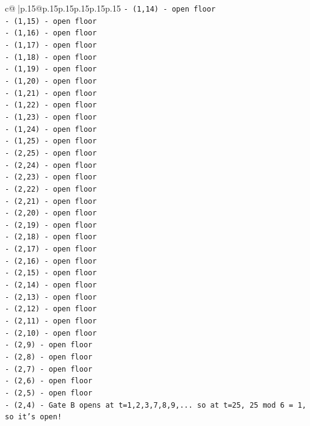 \documentclass{article}
\begin{document}
{\begin{supertabular}{c@{$\;$}|p{.15\linewidth}@{}p{.15\linewidth}p{.15\linewidth}p{.15\linewidth}p{.15\linewidth}p{.15\linewidth}}
{{{\texttt{{-} (1,14) {-} open floor} \\
\texttt{{-} (1,15) {-} open floor} \\
\texttt{{-} (1,16) {-} open floor} \\
\texttt{{-} (1,17) {-} open floor} \\
\texttt{{-} (1,18) {-} open floor} \\
\texttt{{-} (1,19) {-} open floor} \\
\texttt{{-} (1,20) {-} open floor} \\
\texttt{{-} (1,21) {-} open floor} \\
\texttt{{-} (1,22) {-} open floor} \\
\texttt{{-} (1,23) {-} open floor} \\
\texttt{{-} (1,24) {-} open floor} \\
\texttt{{-} (1,25) {-} open floor} \\
\texttt{{-} (2,25) {-} open floor} \\
\texttt{{-} (2,24) {-} open floor} \\
\texttt{{-} (2,23) {-} open floor} \\
\texttt{{-} (2,22) {-} open floor} \\
\texttt{{-} (2,21) {-} open floor} \\
\texttt{{-} (2,20) {-} open floor} \\
\texttt{{-} (2,19) {-} open floor} \\
\texttt{{-} (2,18) {-} open floor} \\
\texttt{{-} (2,17) {-} open floor} \\
\texttt{{-} (2,16) {-} open floor} \\
\texttt{{-} (2,15) {-} open floor} \\
\texttt{{-} (2,14) {-} open floor} \\
\texttt{{-} (2,13) {-} open floor} \\
\texttt{{-} (2,12) {-} open floor} \\
\texttt{{-} (2,11) {-} open floor} \\
\texttt{{-} (2,10) {-} open floor} \\
\texttt{{-} (2,9) {-} open floor} \\
\texttt{{-} (2,8) {-} open floor} \\
\texttt{{-} (2,7) {-} open floor} \\
\texttt{{-} (2,6) {-} open floor} \\
\texttt{{-} (2,5) {-} open floor} \\
\texttt{{-} (2,4) {-} Gate B opens at t=1,2,3,7,8,9,... so at t=25, 25 mod 6 = 1, so it's open!} \\
}}}
\end{supertabular}}
\end{document}
